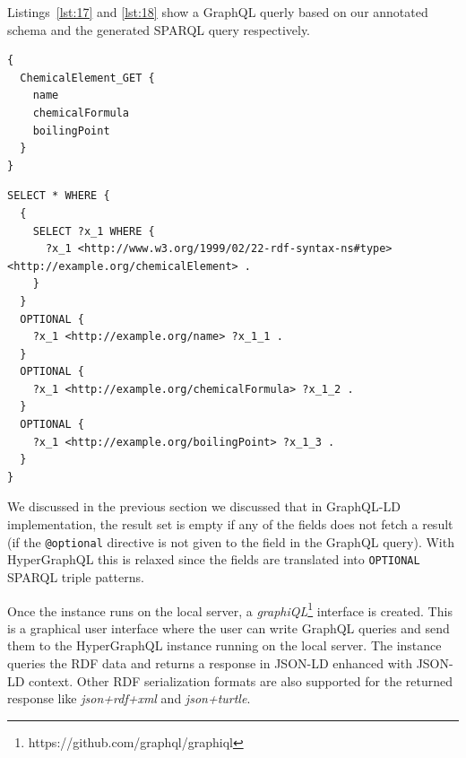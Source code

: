 Listings~\ref{lst:17} and \ref{lst:18} show a GraphQL querly based on our annotated schema and the generated SPARQL query respectively.


\begin{minipage}{\linewidth}
\begin{lstlisting}[label=lst:17, caption={An example query in HyperGraphQL}, language=GraphQL]
{
  ChemicalElement_GET {
    name
    chemicalFormula
    boilingPoint
  }
}
\end{lstlisting}
\end{minipage}


\begin{minipage}{\linewidth}
\begin{lstlisting}[columns=fullflexible, label=lst:18, caption={The generated SPARQL query}, language=SPARQL]
SELECT * WHERE { 
  { 
    SELECT ?x_1 WHERE { 
      ?x_1 <http://www.w3.org/1999/02/22-rdf-syntax-ns#type> <http://example.org/chemicalElement> . 
	}  
  }  
  OPTIONAL { 
    ?x_1 <http://example.org/name> ?x_1_1 . 
  }  
  OPTIONAL { 
    ?x_1 <http://example.org/chemicalFormula> ?x_1_2 . 
  }  
  OPTIONAL { 
    ?x_1 <http://example.org/boilingPoint> ?x_1_3 . 
  }  
}
\end{lstlisting}
\end{minipage}

We discussed in the previous section we discussed that in GraphQL-LD implementation, the result set is empty if any of the fields does not fetch a result (if the \texttt{@optional} directive is not given to the field in the GraphQL query). With HyperGraphQL this is relaxed since the fields are translated into \texttt{OPTIONAL} SPARQL triple patterns.

Once the instance runs on the local server, a \textit{graphiQL}\footnote{https://github.com/graphql/graphiql} interface is created. This is a graphical user interface where the user can write GraphQL queries and send them to the HyperGraphQL instance running on the local server. The instance queries the RDF data and returns a response in JSON-LD enhanced with JSON-LD context. Other RDF serialization formats are also supported for the returned response like \textit{json+rdf+xml} and \textit{json+turtle}.
